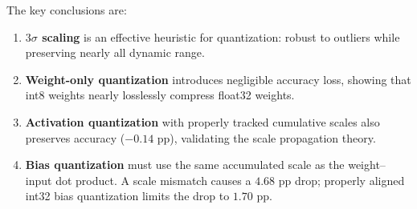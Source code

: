 \documentclass[11pt, letterpaper]{article}
\begin{document}
The key conclusions are:
\begin{enumerate}
  \item \textbf{$3\sigma$ scaling} is an effective heuristic for quantization:
        robust to outliers while preserving nearly all dynamic range.
  \item \textbf{Weight-only quantization} introduces negligible accuracy loss,
        showing that int8 weights nearly losslessly compress float32 weights.
  \item \textbf{Activation quantization} with properly tracked cumulative scales
        also preserves accuracy ($-0.14$ pp), validating the scale propagation theory.
  \item \textbf{Bias quantization} must use the same accumulated scale as the
        weight--input dot product. A scale mismatch causes a $4.68$ pp drop;
        properly aligned int32 bias quantization limits the drop to $1.70$ pp.
\end{enumerate}
\end{document}
